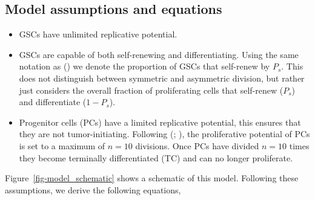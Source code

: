 \documentclass[
  letterpaper,
]{scrreprt}
\theoremstyle{definition}
\theoremstyle{remark}
\begin{document}
\subsection{Model assumptions and
equations}\label{sec-model-assumptions}

\begin{itemize}
\item
  GSCs have unlimited replicative potential.
\item
  GSCs are capable of both self-renewing and differentiating. Using the
  same notation as () we denote the proportion of GSCs that self-renew by \(P_s\).
  This does not distinguish between symmetric and asymmetric division,
  but rather just considers the overall fraction of proliferating cells
  that self-renew (\(P_s\)) and differentiate (\(1 - P_s\)).
\item
  Progenitor cells (PCs) have a limited replicative potential, this
  ensures that they are not tumor-initiating. Following
  (;
  ), the proliferative potential
  of PCs is set to a maximum of \(n = 10\) divisions. Once PCs have
  divided \(n=10\) times they become terminally differentiated (TC) and
  can no longer proliferate.
\end{itemize}

Figure~\ref{fig-model_schematic} shows a schematic of this model.
Following these assumptions, we derive the following equations,
\end{document}

